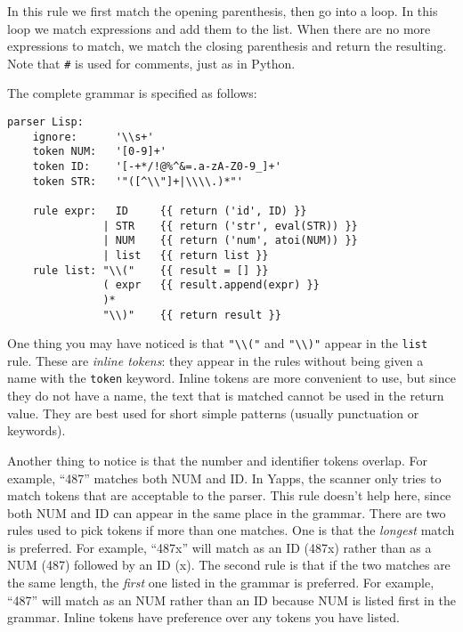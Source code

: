 \documentclass[10pt]{article}
\begin{document}
In this rule we first match the opening parenthesis, then go into a
loop.  In this loop we match expressions and add them to the list.
When there are no more expressions to match, we match the closing
parenthesis and return the resulting.  Note that \verb:#: is used for
comments, just as in Python.

The complete grammar is specified as follows:
\begin{verbatim}
parser Lisp:
    ignore:      '\\s+'
    token NUM:   '[0-9]+'
    token ID:    '[-+*/!@%^&=.a-zA-Z0-9_]+' 
    token STR:   '"([^\\"]+|\\\\.)*"'

    rule expr:   ID     {{ return ('id', ID) }}
               | STR    {{ return ('str', eval(STR)) }}
               | NUM    {{ return ('num', atoi(NUM)) }}
               | list   {{ return list }}
    rule list: "\\("    {{ result = [] }} 
               ( expr   {{ result.append(expr) }}
               )*  
               "\\)"    {{ return result }} 
\end{verbatim}

One thing you may have noticed is that \verb|"\\("| and \verb|"\\)"|
appear in the \texttt{list} rule.  These are \emph{inline tokens}:
they appear in the rules without being given a name with the
\texttt{token} keyword.  Inline tokens are more convenient to use, but
since they do not have a name, the text that is matched cannot be used
in the return value.  They are best used for short simple patterns
(usually punctuation or keywords).

Another thing to notice is that the number and identifier tokens
overlap.  For example, ``487'' matches both NUM and ID.  In Yapps, the
scanner only tries to match tokens that are acceptable to the parser.
This rule doesn't help here, since both NUM and ID can appear in the
same place in the grammar.  There are two rules used to pick tokens if
more than one matches.  One is that the \emph{longest} match is
preferred.  For example, ``487x'' will match as an ID (487x) rather
than as a NUM (487) followed by an ID (x).  The second rule is that if
the two matches are the same length, the \emph{first} one listed in
the grammar is preferred.  For example, ``487'' will match as an NUM
rather than an ID because NUM is listed first in the grammar.  Inline
tokens have preference over any tokens you have listed.
\end{document}
